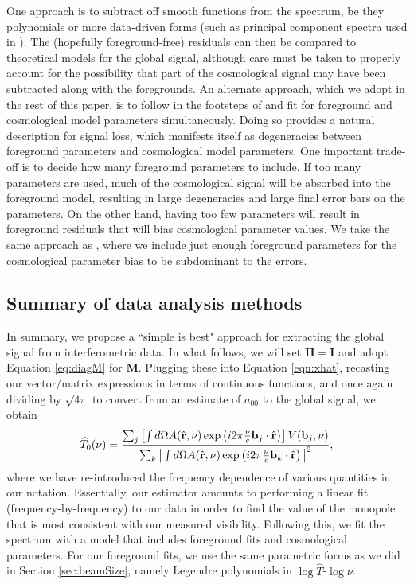 \documentclass[twocolumn,apj,numberedappendix]{emulateapj}
\newcommand{\Hmat}{\mathbf{H}}
\newcommand{\M}{\mathbf{M}}
\newcommand{\rhat}{\hat{\mathbf{r}}}
\begin{document}
One approach is to subtract off smooth functions from the spectrum, be they polynomials or more data-driven forms (such as principal component spectra used in \citealt{Liu_Switzer_2014}). The (hopefully foreground-free) residuals can then be compared to theoretical models for the global signal, although care must be taken to properly account for the possibility that part of the cosmological signal may have been subtracted along with the foregrounds. An alternate approach, which we adopt in the rest of this paper, is to follow in the footsteps of \citet{PritchardLoeb2010,DAREMCMC,BernardiLEDA} and fit for foreground and cosmological model parameters simultaneously. Doing so provides a natural description for signal loss, which manifests itself as degeneracies between foreground parameters and cosmological model parameters. One important trade-off is to decide how many foreground parameters to include. If too many parameters are used, much of the cosmological signal will be absorbed into the foreground model, resulting in large degeneracies and large final error bars on the parameters. On the other hand, having too few parameters will result in foreground residuals that will bias cosmological parameter values. We take the same approach as \citet{BernardiLEDA}, where we include just enough foreground parameters for the cosmological parameter bias to be subdominant to the errors.

\subsection{Summary of data analysis methods}

In summary, we propose a ``simple is best" approach for extracting the global signal from interferometric data. In what follows, we will set $\Hmat = \mathbf{I}$ and adopt Equation \eqref{eq:diagM} for $\M$. Plugging these into Equation \eqref{eqn:xhat}, recasting our vector/matrix expressions in terms of continuous functions, and once again dividing by $\sqrt{4 \pi}$ to convert from an estimate of $a_{00}$ to the global signal, we obtain
\begin{equation}
\label{eq:IntegralEstInterferometer}
\widehat{T}_0 (\nu)= \frac{\sum_j \left[ \int d\Omega A(\rhat, \nu) \exp\left( i 2 \pi \frac{\nu }{c} \mathbf{b}_j \cdot \rhat \right)\right] V(\mathbf{b}_j, \nu)}{\sum_k \big{|} \int d\Omega A(\rhat, \nu) \exp\left( i 2 \pi \frac{\nu }{c} \mathbf{b}_k \cdot \rhat \right) \big{|}^2},
\end{equation}
where we have re-introduced the frequency dependence of various quantities in our notation. Essentially, our estimator amounts to performing a linear fit (frequency-by-frequency) to our data in order to find the value of the monopole that is most consistent with our measured visibility. Following this, we fit the spectrum with a model that includes foreground fits and cosmological parameters. For our foreground fits, we use the same parametric forms as we did in Section \ref{sec:beamSize}, namely Legendre polynomials in $\log \widehat{T}$-$\log \nu$.
\end{document}
